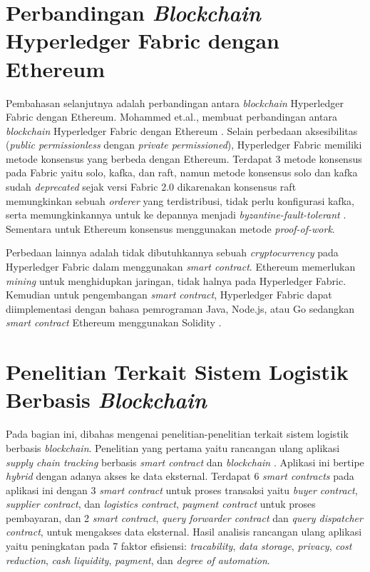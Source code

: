 \section{Perbandingan \textit{Blockchain} Hyperledger Fabric dengan Ethereum}
Pembahasan selanjutnya adalah perbandingan antara \textit{blockchain} Hyperledger Fabric dengan Ethereum. Mohammed et.al., membuat perbandingan antara \textit{blockchain} Hyperledger Fabric dengan Ethereum \citep{Mohammed2021}. Selain perbedaan aksesibilitas (\textit{public permissionless} dengan \textit{private permissioned}), Hyperledger Fabric memiliki metode konsensus yang berbeda dengan Ethereum. Terdapat 3 metode konsensus pada Fabric yaitu solo, kafka, dan raft, namun metode konsensus solo dan kafka sudah \textit{deprecated} sejak versi Fabric 2.0 dikarenakan konsensus raft memungkinkan sebuah \textit{orderer} yang terdistribusi, tidak perlu konfigurasi kafka, serta memungkinkannya untuk ke depannya menjadi \textit{byzantine-fault-tolerant} \citep{hyperledger}. Sementara untuk Ethereum konsensus menggunakan metode \textit{proof-of-work}. 

Perbedaan lainnya adalah tidak dibutuhkannya sebuah \textit{cryptocurrency} pada Hyperledger Fabric dalam menggunakan \textit{smart contract}. Ethereum memerlukan \textit{mining} untuk menghidupkan jaringan, tidak halnya pada Hyperledger Fabric. Kemudian untuk pengembangan \textit{smart contract}, Hyperledger Fabric dapat diimplementasi dengan bahasa pemrograman Java, Node.js, atau Go sedangkan \textit{smart contract} Ethereum menggunakan Solidity \citep{Mohammed2021}.

\section{Penelitian Terkait Sistem Logistik Berbasis \textit{Blockchain}}
\label{sec:penelitianlain}

Pada bagian ini, dibahas mengenai penelitian-penelitian terkait sistem logistik berbasis \textit{blockchain}. Penelitian yang pertama yaitu rancangan ulang aplikasi \textit{supply chain tracking} berbasis \textit{smart contract} dan \textit{blockchain} \citep{Chang2019}. Aplikasi ini bertipe \textit{hybrid} dengan adanya akses ke data eksternal. Terdapat 6 \textit{smart contracts} pada aplikasi ini dengan 3 \textit{smart contract} untuk proses transaksi yaitu \textit{buyer contract}, \textit{supplier contract}, dan \textit{logistics contract}, \textit{payment contract} untuk proses pembayaran, dan 2 \textit{smart contract}, \textit{query forwarder contract} dan \textit{query dispatcher contract}, untuk mengakses data eksternal. Hasil analisis rancangan ulang aplikasi yaitu peningkatan pada 7 faktor efisiensi: \textit{tracability}, \textit{data storage}, \textit{privacy}, \textit{cost reduction}, \textit{cash liquidity}, \textit{payment}, dan \textit{degree of automation}.

